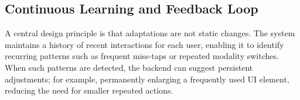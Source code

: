 \documentclass[openany]{book}
\begin{document}

\subsection{Continuous Learning and Feedback Loop}
A central design principle is that adaptations are not static changes. The system maintains a history of recent interactions for each user, enabling it to identify recurring patterns such as frequent miss-taps or repeated modality switches. When such patterns are detected, the backend can suggest persistent adjustments; for example, permanently enlarging a frequently used UI element, reducing the need for smaller repeated actions.
\end{document}
